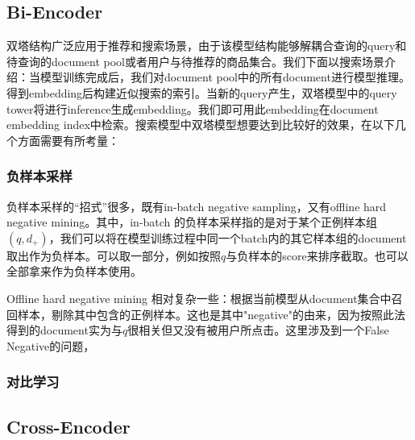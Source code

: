 \subsection{Bi-Encoder}

双塔结构广泛应用于推荐和搜索场景，由于该模型结构能够解耦合查询的query和待查询的document pool或者用户与待推荐的商品集合。我们下面以搜索场景介绍：当模型训练完成后，我们对document pool中的所有document进行模型推理。得到embedding后构建近似搜索的索引。当新的query产生，双塔模型中的query tower将进行inference生成embedding。我们即可用此embedding在document embedding index中检索。搜索模型中双塔模型想要达到比较好的效果，在以下几个方面需要有所考量：

\subsubsection{负样本采样}

负样本采样的“招式”很多，既有in-batch negative sampling，又有offline hard negative mining。其中，in-batch 的负样本采样指的是对于某个正例样本组$(q,d_+)$，我们可以将在模型训练过程中同一个batch内的其它样本组的document取出作为负样本。可以取一部分，例如按照$q$与负样本的score来排序截取。也可以全部拿来作为负样本使用。

Offline hard negative mining 相对复杂一些：根据当前模型从document集合中召回样本，剔除其中包含的正例样本。这也是其中"negative"的由来，因为按照此法得到的document实为与$q$很相关但又没有被用户所点击。这里涉及到一个False Negative的问题，

\subsubsection{对比学习}






\subsection{Cross-Encoder}
